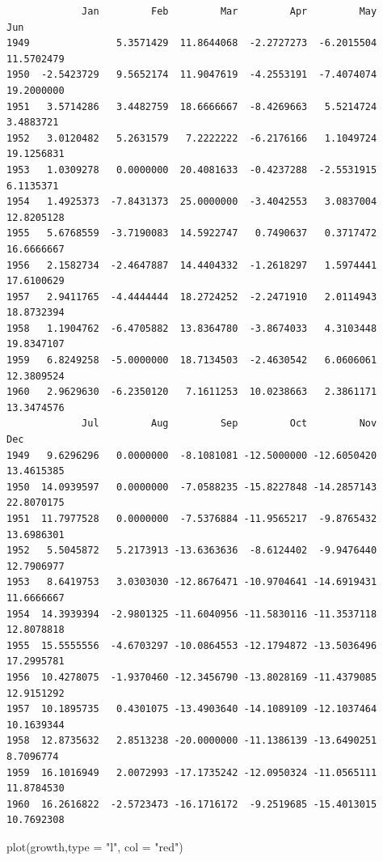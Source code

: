\documentclass[
  letterpaper,
  DIV=11,
  numbers=noendperiod]{scrreprt}
\newenvironment{Shaded}{\begin{snugshade}}{\end{snugshade}}
\newcommand{\AttributeTok}[1]{\textcolor[rgb]{0.40,0.45,0.13}{#1}}
\newcommand{\FunctionTok}[1]{\textcolor[rgb]{0.28,0.35,0.67}{#1}}
\newcommand{\NormalTok}[1]{\textcolor[rgb]{0.00,0.23,0.31}{#1}}
\newcommand{\StringTok}[1]{\textcolor[rgb]{0.13,0.47,0.30}{#1}}
\begin{document}
\begin{verbatim}
             Jan         Feb         Mar         Apr         May         Jun
1949               5.3571429  11.8644068  -2.2727273  -6.2015504  11.5702479
1950  -2.5423729   9.5652174  11.9047619  -4.2553191  -7.4074074  19.2000000
1951   3.5714286   3.4482759  18.6666667  -8.4269663   5.5214724   3.4883721
1952   3.0120482   5.2631579   7.2222222  -6.2176166   1.1049724  19.1256831
1953   1.0309278   0.0000000  20.4081633  -0.4237288  -2.5531915   6.1135371
1954   1.4925373  -7.8431373  25.0000000  -3.4042553   3.0837004  12.8205128
1955   5.6768559  -3.7190083  14.5922747   0.7490637   0.3717472  16.6666667
1956   2.1582734  -2.4647887  14.4404332  -1.2618297   1.5974441  17.6100629
1957   2.9411765  -4.4444444  18.2724252  -2.2471910   2.0114943  18.8732394
1958   1.1904762  -6.4705882  13.8364780  -3.8674033   4.3103448  19.8347107
1959   6.8249258  -5.0000000  18.7134503  -2.4630542   6.0606061  12.3809524
1960   2.9629630  -6.2350120   7.1611253  10.0238663   2.3861171  13.3474576
             Jul         Aug         Sep         Oct         Nov         Dec
1949   9.6296296   0.0000000  -8.1081081 -12.5000000 -12.6050420  13.4615385
1950  14.0939597   0.0000000  -7.0588235 -15.8227848 -14.2857143  22.8070175
1951  11.7977528   0.0000000  -7.5376884 -11.9565217  -9.8765432  13.6986301
1952   5.5045872   5.2173913 -13.6363636  -8.6124402  -9.9476440  12.7906977
1953   8.6419753   3.0303030 -12.8676471 -10.9704641 -14.6919431  11.6666667
1954  14.3939394  -2.9801325 -11.6040956 -11.5830116 -11.3537118  12.8078818
1955  15.5555556  -4.6703297 -10.0864553 -12.1794872 -13.5036496  17.2995781
1956  10.4278075  -1.9370460 -12.3456790 -13.8028169 -11.4379085  12.9151292
1957  10.1895735   0.4301075 -13.4903640 -14.1089109 -12.1037464  10.1639344
1958  12.8735632   2.8513238 -20.0000000 -11.1386139 -13.6490251   8.7096774
1959  16.1016949   2.0072993 -17.1735242 -12.0950324 -11.0565111  11.8784530
1960  16.2616822  -2.5723473 -16.1716172  -9.2519685 -15.4013015  10.7692308
\end{verbatim}

\begin{Shaded}
\begin{Highlighting}[]
\FunctionTok{plot}\NormalTok{(growth,}\AttributeTok{type =} \StringTok{"l"}\NormalTok{, }\AttributeTok{col =} \StringTok{"red"}\NormalTok{)}
\end{Highlighting}
\end{Shaded}
\end{document}
